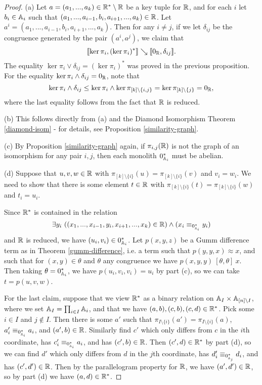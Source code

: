 \documentclass[letterpaper,11pt]{article}
\begin{document}
\begin{proof} (a) Let $a = (a_1, ..., a_k) \in \mathbb{R}^*\setminus \mathbb{R}$ be a key tuple for $\mathbb{R}$, and for each $i$ let $b_i \in \mathbb{A}_i$ such that $(a_1, ..., a_{i-1}, b_i, a_{i+1}, ..., a_k) \in \mathbb{R}$. Let $a^i = (a_1, ..., a_{i-1}, b_i, a_{i+1}, ..., a_k)$. Then for any $i \ne j$, if we let $\delta_{ij}$ be the congruence generated by the pair $(a^i, a^j)$, we claim that
\[
\llbracket \ker \pi_i, (\ker \pi_i)^* \rrbracket \searrow \llbracket 0_{\mathbb{R}}, \delta_{ij} \rrbracket.
\]
The equality $\ker \pi_i \vee \delta_{ij} = (\ker \pi_i)^*$ was proved in the previous proposition. For the equality $\ker \pi_i \wedge \delta_{ij} = 0_{\mathbb{R}}$, note that
\[
\ker \pi_i \wedge \delta_{ij} \le \ker \pi_i \wedge \ker \pi_{[k]\setminus\{i,j\}} = \ker \pi_{[k]\setminus \{j\}} = 0_{\mathbb{R}},
\]
where the last equality follows from the fact that $\mathbb{R}$ is reduced.

(b) This follows directly from (a) and the Diamond Isomorphism Theorem \ref{diamond-isom} - for details, see Proposition \ref{similarity-graph}.

(c) By Proposition \ref{similarity-graph} again, if $\pi_{i,j}(\mathbb{R})$ is not the graph of an isomorphism for any pair $i,j$, then each monolith $0_{\mathbb{A}_i}^*$ must be abelian.

(d) Suppose that $u,v,w \in \mathbb{R}$ with $\pi_{[k]\setminus\{i\}}(u) = \pi_{[k]\setminus \{i\}}(v)$ and $v_i = w_i$. We need to show that there is some element $t \in \mathbb{R}$ with $\pi_{[k]\setminus\{i\}}(t) = \pi_{[k]\setminus\{i\}}(w)$ and $t_i = u_i$.

Since $\mathbb{R}^*$ is contained in the relation
\[
\exists y_i\ ((x_1, ..., x_{i-1}, y_i, x_{i+1}, ..., x_k) \in \mathbb{R}) \wedge (x_i \equiv_{0_{\mathbb{A}_i}^*} y_i)
\]
and $\mathbb{R}$ is reduced, we have $(u_i,v_i) \in 0_{\mathbb{A}_i}^*$. Let $p(x,y,z)$ be a Gumm difference term as in Theorem \ref{gumm-difference}, i.e. a term such that $p(y,y,x) \approx x$, and such that for $(x,y) \in \theta$ and $\theta$ any congruence we have $p(x,y,y)\ [\theta, \theta]\ x$. Then taking $\theta = 0_{\mathbb{A}_i}^*$, we have $p(u_i,v_i,v_i) = u_i$ by part (c), so we can take $t = p(u,v,w)$.

For the last claim, suppose that we view $\mathbb{R}^*$ as a binary relation on $\mathbb{A}_I \times \mathbb{A}_{[n]\setminus I}$, where we set $\mathbb{A}_I = \prod_{i \in I} \mathbb{A}_i$, and that we have $(a,b), (c,b), (c,d) \in \mathbb{R}^*$. Pick some $i \in I$ and $j \not\in I$. Then there is some $a'$ such that $\pi_{I\setminus\{i\}}(a') = \pi_{I\setminus\{i\}}(a)$, $a_i' \equiv_{0^*_{\mathbb{A}_i}} a_i$, and $(a',b) \in \mathbb{R}$. Similarly find $c'$ which only differs from $c$ in the $i$th coordinate, has $c_i' \equiv_{0^*_{\mathbb{A}_i}} a_i$, and has $(c',b) \in \mathbb{R}$. Then $(c',d) \in \mathbb{R}^*$ by part (d), so we can find $d'$ which only differs from $d$ in the $j$th coordinate, has $d_i' \equiv_{0^*_{\mathbb{A}_j}} d_i$, and has $(c',d') \in \mathbb{R}$. Then by the parallelogram property for $\mathbb{R}$, we have $(a',d') \in \mathbb{R}$, so by part (d) we have $(a,d) \in \mathbb{R}^*$.
\end{proof}
\end{document}
